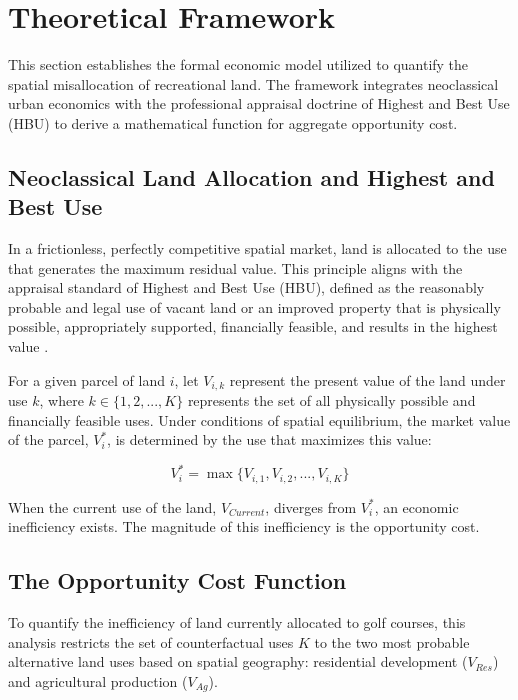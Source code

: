 \documentclass[10pt, letterpaper]{article}
\begin{document}
\newpage

\section{Theoretical Framework}
This section establishes the formal economic model utilized to quantify the spatial misallocation of recreational land. The framework integrates neoclassical urban economics with the professional appraisal doctrine of Highest and Best Use (HBU) to derive a mathematical function for aggregate opportunity cost.

\subsection{Neoclassical Land Allocation and Highest and Best Use}
In a frictionless, perfectly competitive spatial market, land is allocated to the use that generates the maximum residual value. This principle aligns with the appraisal standard of Highest and Best Use (HBU), defined as the reasonably probable and legal use of vacant land or an improved property that is physically possible, appropriately supported, financially feasible, and results in the highest value \parencite{AppraisalInstitute2020}. 

For a given parcel of land $i$, let $V_{i,k}$ represent the present value of the land under use $k$, where $k \in \{1, 2, ..., K\}$ represents the set of all physically possible and financially feasible uses. Under conditions of spatial equilibrium, the market value of the parcel, $V_i^*$, is determined by the use that maximizes this value:

\begin{equation}
    V_i^* = \max \{V_{i,1}, V_{i,2}, ..., V_{i,K}\}
\end{equation}

When the current use of the land, $V_{Current}$, diverges from $V_i^*$, an economic inefficiency exists. The magnitude of this inefficiency is the opportunity cost.

\subsection{The Opportunity Cost Function}
To quantify the inefficiency of land currently allocated to golf courses, this analysis restricts the set of counterfactual uses $K$ to the two most probable alternative land uses based on spatial geography: residential development ($V_{Res}$) and agricultural production ($V_{Ag}$). 
\end{document}

